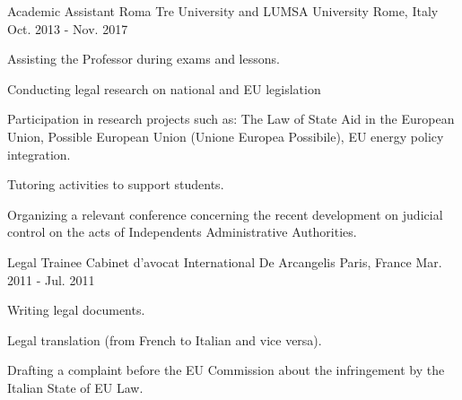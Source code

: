 \begin{cventries}
  \cventry
    {Academic Assistant} %
    {Roma Tre University and LUMSA University} %
    {Rome, Italy} %
    {Oct. 2013 - Nov. 2017} %
    {
      \begin{cvitems} %
      	\item {Assisting the Professor during exams and lessons.}      	
      	\item {Conducting legal research on national and EU legislation}
        \item {Participation in research projects such as: The Law of State Aid in the European Union, Possible European Union (Unione Europea Possibile), EU energy policy integration.}
        \item {Tutoring activities to support students.}
       \item {Organizing a relevant conference concerning the recent development on judicial control on the acts of Independents Administrative Authorities.}
      \end{cvitems}
    }

  \cventry
    {Legal Trainee} %
    {Cabinet d'avocat International De Arcangelis} %
    {Paris, France} %
    {Mar. 2011 - Jul. 2011} %
    {
      \begin{cvitems} %
      	\item {Writing legal documents.}      	
      	\item {Legal translation (from French to Italian and vice versa).}
        \item {Drafting a complaint before the EU Commission about the infringement by the Italian State of EU Law.}
      \end{cvitems}
    }
\end{cventries}
